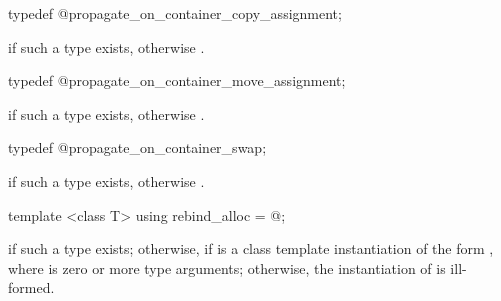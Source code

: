 %
%
\begin{itemdecl}
typedef @\seebelow@ propagate_on_container_copy_assignment;
\end{itemdecl}

\begin{itemdescr}
\pnum
\ctype {} if such a type
exists, otherwise .
\end{itemdescr}

%
%
\begin{itemdecl}
typedef @\seebelow@ propagate_on_container_move_assignment;
\end{itemdecl}

\begin{itemdescr}
\pnum
\ctype {} if such a type
exists, otherwise .
\end{itemdescr}

%
%
\begin{itemdecl}
typedef @\seebelow@ propagate_on_container_swap;
\end{itemdecl}

\begin{itemdescr}
\pnum
\ctype {} if such a type exists, otherwise .
\end{itemdescr}

%
%
\begin{itemdecl}
template <class T> using rebind_alloc = @\seebelow@;
\end{itemdecl}

\begin{itemdescr}
\pnum
\templalias {} if such a type exists; otherwise,
 if  is a class template instantiation
of the form , where  is zero or more type arguments;
otherwise, the instantiation of  is ill-formed.
\end{itemdescr}

